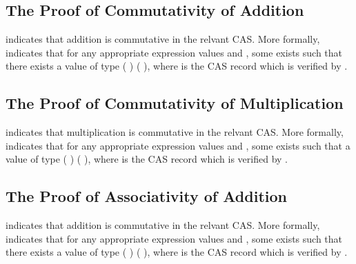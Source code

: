 \documentclass{report}
\begin{document}
\subsection{The Proof of Commutativity of Addition}
 indicates that addition is commutative in the relvant CAS.  More formally,   indicates that for any appropriate expression values  and , some  exists such that there exists a value of type   \AgdaSymbol(   \AgdaSymbol) \AgdaSymbol(   \AgdaSymbol), where  is the CAS record which is verified by .

\subsection{The Proof of Commutativity of Multiplication}
 indicates that multiplication is commutative in the relvant CAS.  More formally,   indicates that for any appropriate expression values  and , some  exists such that a value of type   \AgdaSymbol(   \AgdaSymbol) \AgdaSymbol(   \AgdaSymbol), where  is the CAS record which is verified by .

\subsection{The Proof of Associativity of Addition}
 indicates that addition is commutative in the relvant CAS.  More formally,   indicates that for any appropriate expression values  and , some  exists such that there exists a value of type   \AgdaSymbol(   \AgdaSymbol) \AgdaSymbol(   \AgdaSymbol), where  is the CAS record which is verified by .
\end{document}
